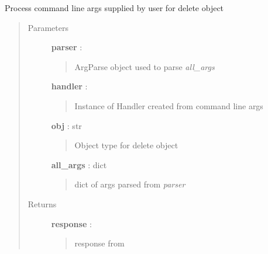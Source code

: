 \documentclass[letterpaper,10pt,english]{sphinxmanual}
\begin{document}
\begin{fulllineitems}
\label{pytan.utils:pytan.utils.process_delete_object_args}
Process command line args supplied by user for delete object
\begin{quote}\begin{description}
\item[{Parameters}] \leavevmode
\textbf{parser} : 
\begin{quote}

ArgParse object used to parse \emph{all\_args}
\end{quote}

\textbf{handler} : {\hyperref[pytan.handler:pytan.handler.Handler]{}}
\begin{quote}

Instance of Handler created from command line args
\end{quote}

\textbf{obj} : str
\begin{quote}

Object type for delete object
\end{quote}

\textbf{all\_args} : dict
\begin{quote}

dict of args parsed from \emph{parser}
\end{quote}

\item[{Returns}] \leavevmode
\textbf{response} : {\hyperref[taniumpy.object_types:taniumpy.object_types.base.BaseType]{}}
\begin{quote}

response from {\hyperref[pytan.handler:pytan.handler.Handler.delete]{}}
\end{quote}

\end{description}\end{quote}

\end{fulllineitems}

\end{document}

